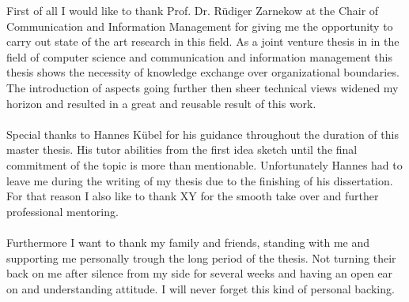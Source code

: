 \thispagestyle{empty}
\vspace*{3cm}

\vspace*{1cm}
\noindent 
First of all I would like to thank Prof. Dr. Rüdiger Zarnekow at the Chair of Communication and Information Management for giving me the opportunity to carry out state of the art research in this field. As a joint venture thesis in in the field of computer science and communication and information management this thesis shows the necessity of knowledge exchange over organizational boundaries. The introduction of aspects going further then sheer technical views widened my horizon and resulted in a great and reusable result of this work. 
\\
\\
Special thanks to Hannes Kübel for his guidance throughout the duration of this master thesis. His tutor abilities from the first idea sketch until the final commitment of the topic is more than mentionable. Unfortunately Hannes had to leave me during the writing of my thesis due to the finishing of his dissertation. For that reason I also like to thank XY for the smooth take over and further professional mentoring.
\\
\\
Furthermore I want to thank my family and friends, standing with me and supporting me personally trough the long period of the thesis. Not turning their back on me after silence from my side for several weeks and having an open ear on and understanding attitude. I will never forget this kind of personal backing.